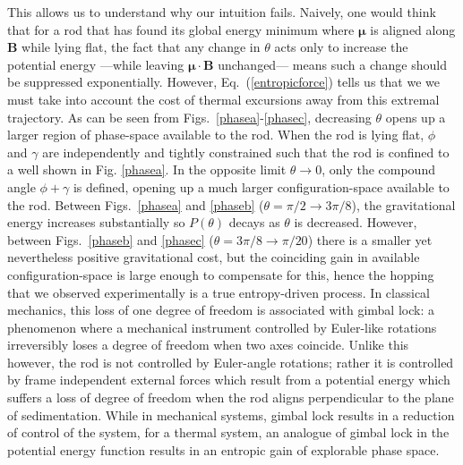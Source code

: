 \documentclass[aps,prl,twocolumn,superscriptaddress]{revtex4-1}
\newcommand{\vcrm}[1]{\mathbf{#1}}
\newcommand{\vc}[1]{\boldsymbol{#1}}
\begin{document}
This allows us to understand why our intuition fails. Naively, one would think that for a rod that has found its global energy minimum where $\vc{\mu}$ is aligned along $\vcrm{B}$ while lying flat, the fact that any change in $\theta$ acts only to increase the potential energy ---while leaving $\vc{\mu}\cdot\vcrm{B}$ unchanged--- means such a change should be suppressed exponentially. However, Eq.\ (\ref{entropicforce}) tells us that we we must take into account the cost of thermal excursions away from this extremal trajectory. As can be seen from Figs.\ \ref{phasea}-\ref{phasec}, decreasing $\theta$ opens up a larger region of phase-space available to the rod. When the rod is lying flat, $\phi$ and $\gamma$ are independently and tightly constrained such that the rod is confined to a well shown in Fig. \ref{phasea}. In the opposite limit $\theta\rightarrow0$, only the compound angle $\phi+\gamma$ is defined, opening up a much larger configuration-space available to the rod. Between Figs.\ \ref{phasea} and \ref{phaseb} ($\theta=\pi/2\rightarrow 3\pi/8$), the gravitational energy increases substantially so $P(\theta)$ decays as $\theta$ is decreased. However, between Figs.\ \ref{phaseb} and \ref{phasec} ($\theta=3\pi/8\rightarrow\pi/20$) there is a smaller yet nevertheless positive gravitational cost, but the coinciding gain in available configuration-space is large enough to compensate for this, hence the hopping that we observed experimentally is a true entropy-driven process. In classical mechanics, this loss of one degree of freedom is associated with gimbal lock: a phenomenon where a mechanical instrument controlled by Euler-like rotations irreversibly loses a degree of freedom when two axes coincide. Unlike this however, the rod is not controlled by Euler-angle rotations; rather it is controlled by frame independent external forces which result from a potential energy which suffers a loss of degree of freedom when the rod aligns perpendicular to the plane of sedimentation. While in mechanical systems, gimbal lock results in a reduction of control of the system, for a thermal system, an analogue of gimbal lock in the potential energy function results in an entropic gain of explorable phase space.
\end{document}
